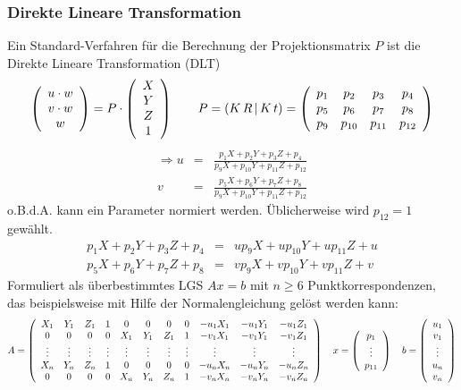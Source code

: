 \subsubsection*{Direkte Lineare Transformation}

Ein Standard-Verfahren für die Berechnung der Projektionsmatrix $P$ ist die Direkte Lineare Transformation (DLT)
$$\left( \begin{array}{c} u \cdot w \\ v \cdot w \\ w \end{array} \right) = P \cdot \left( \begin{array}{c} X \\ Y \\ Z \\ 1 \end{array} \right) \qquad P = (K \, R \, | \, K \, t) = \left( \begin{array}{cccc} p_1 & p_2 & p_3 & p_4 \\ p_5 & p_6 & p_7 & p_8 \\ p_9 & p_{10} & p_{11} & p_{12} \end{array} \right)$$
\begin{eqnarray*}
\Rightarrow u &=& \frac{p_1X + p_2Y + p_3Z + p_4}{p_9X + p_{10}Y + p_{11}Z + p_{12}} \\
v &=& \frac{p_5X + p_6Y + p_7Z + p_8}{p_9X + p_{10}Y + p_{11}Z + p_{12}}
\end{eqnarray*}
o.B.d.A. kann ein Parameter normiert werden. Üblicherweise wird $p_{12} = 1$ gewählt.
\begin{eqnarray*}
p_1X + p_2Y + p_3Z + p_4 &=& up_9X + up_{10}Y + up_{11}Z + u \\
p_5X + p_6Y + p_7Z + p_8 &=& vp_9X + vp_{10}Y + vp_{11}Z + v
\end{eqnarray*}
Formuliert als überbestimmtes LGS $Ax = b$ mit $n \geq 6$ Punktkorrespondenzen, das beispielsweise mit Hilfe der Normalengleichung gelöst werden kann:
$$A = \left( \begin{array}{ccccccccccc} X_1 & Y_1 & Z_1 & 1 & 0 & 0 & 0 & 0 & -u_1X_1 & -u_1Y_1 & -u_1Z_1 \\ 0 & 0 & 0 & 0 & X_1 & Y_1 & Z_1 & 1 & -v_1X_1 & -v_1Y_1 & -v_1Z_1 \\ \vdots & \vdots & \vdots & \vdots & \vdots & \vdots & \vdots & \vdots & \vdots & \vdots & \vdots \\ X_n & Y_n & Z_n & 1 & 0 & 0 & 0 & 0 & -u_nX_n & -u_nY_n & -u_nZ_n \\ 0 & 0 & 0 & 0 & X_n & Y_n & Z_n & 1 & -v_nX_n & -v_nY_n & -v_nZ_n \end{array} \right) \quad x = \left( \begin{array}{c} p_1 \\ \vdots \\ p_{11} \end{array} \right) \quad b = \left( \begin{array}{c} u_1 \\ v_1 \\ \vdots \\ u_n \\ v_n \end{array} \right)$$

